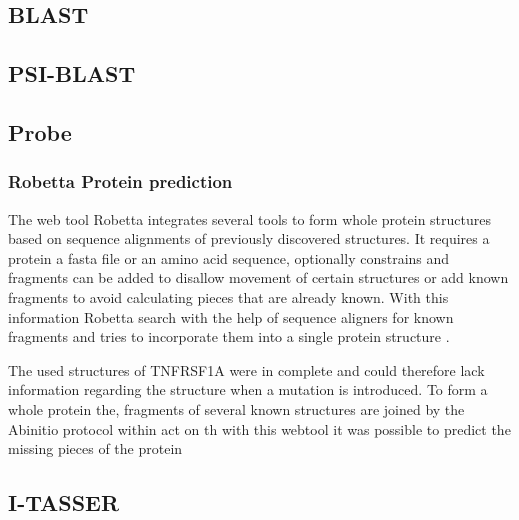 \subsection{BLAST}
\label{subsec:MM_BLAST}

\subsection{PSI-BLAST}
\label{subsec:MM_PSI_BLAST}

\subsection{Probe}
\label{subsec:MM_Probe}

\subsubsection{Robetta Protein prediction}
The web tool Robetta integrates several tools to form whole protein structures based on sequence alignments of previously discovered structures. It requires a protein a fasta file or an amino acid sequence, optionally constrains and fragments can be added to disallow movement of certain structures or add known fragments to avoid calculating pieces that are already known. With this information Robetta search with the help of sequence aligners for known fragments and tries to incorporate them into a single protein structure \cite{}.

The used structures of TNFRSF1A were in complete and could therefore lack information regarding the structure when a mutation is introduced. To form a whole protein the, fragments of several known structures are joined by the Abinitio protocol within act on th with this webtool it was possible to predict the missing pieces of the protein
\label{subsubsec:MM_Abinitio}

\subsection{I-TASSER}
\label{subsec:MM_I_TASSER}

